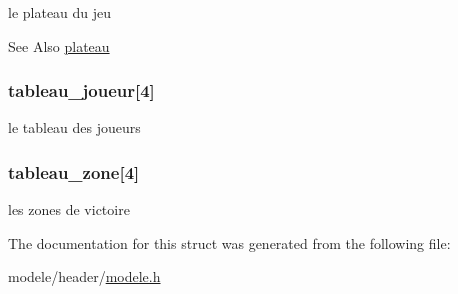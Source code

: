 le plateau du jeu 

\begin{DoxySeeAlso}{See Also}
\hyperlink{struct_modele_a274d642eb6fb8198fe001160fd7d3f8a}{plateau} 
\end{DoxySeeAlso}
\hypertarget{struct_modele_a17b14d4b8715460060a9e5e252060783}{
\subsubsection[{tableau\-\_\-joueur}]{ tableau\-\_\-joueur\mbox{[}4\mbox{]}}}\label{struct_modele_a17b14d4b8715460060a9e5e252060783}


le tableau des joueurs 

\hypertarget{struct_modele_ab3f20b5c19f7f0df05d0838b737eb907}{
\subsubsection[{tableau\-\_\-zone}]{ tableau\-\_\-zone\mbox{[}4\mbox{]}}}\label{struct_modele_ab3f20b5c19f7f0df05d0838b737eb907}


les zones de victoire 



The documentation for this struct was generated from the following file\-:\begin{DoxyCompactItemize}
\item 
modele/header/\hyperlink{modele_8h}{modele.\-h}\end{DoxyCompactItemize}

